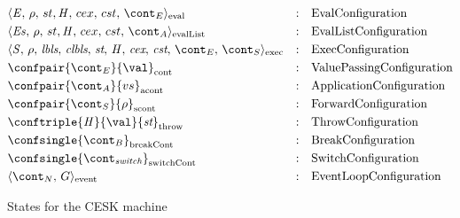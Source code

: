 \documentclass[a4paper,oneside,fleqn]{article}
\begin{document}
\newcommand{\breakconf}[1]{\confsingle{#1}_{\mathrm{breakCont}}}
\newcommand{\switchconf}[1]{\confsingle{#1}_{\mathrm{switchCont}}}
\newcommand{\contconf}[2]{\confpair{#1}{#2}_{\mathrm{cont}}}
\newcommand{\scontconf}[2]{\confpair{#1}{#2}_{\mathrm{scont}}}
\newcommand{\acontconf}[2]{\confpair{#1}{#2}_{\mathrm{acont}}}
\newcommand{\throwconf}[3]{\conftriple{#1}{#2}{#3}_{\mathrm{throw}}}
\newcommand{\evallistconf}[6]{\langle{#1},\,{#2},\,{#3},\handler,\,{#4},\,{#5},\,{#6}\rangle_{\mathrm{evalList}}}
\newcommand{\evalconf}[6]{\langle{#1},\,{#2},\,{#3},\handler,\,{#4},\,{#5},\,{#6}\rangle_{\mathrm{eval}}}
\newcommand{\execconf}[9]{\langle{#1},\,{#2},\,{#3},\,{#4},\,{#5},\,{#6},\,{#7},\,{#8},\,{#9}\rangle_{\mathrm{exec}}}
\newcommand{\eventconf}[2]{\langle{#1},\,{#2}\rangle_{\mathrm{event}}}

\begin{figure}[Htp]
  \begin{eqfigure}
  \begin{align}
    &\evalconf{\expr}{\env}{st}{cex}{cst}{\econt} & :\quad & \text{EvalConfiguration} \label{config:eval}\\
    &\evallistconf{\exprs}{\env}{st}{cex}{cst}{\acont} & :\quad & \text{EvalListConfiguration} \label{config:evallist}\\
    &\execconf{\stmt}{\env}{\lbls}{\clbls}{\strace}{\handler}{\cex,\,\cstrace}{\econt}{\scont}  & :\quad & \text{ExecConfiguration} \label{config:exec}\\
    &\contconf{\econt}{\val} & :\quad & \text{ValuePassingConfiguration} \label{config:econt}\\
    &\acontconf{\acont}{\vals} & :\quad & \text{ApplicationConfiguration} \label{config:acont}\\
    &\scontconf{\scont}{\env} & :\quad & \text{ForwardConfiguration} \label{config:scont}\\
    &\throwconf{\handler}{\val}{\strace} & :\quad & \text{ThrowConfiguration} \label{config:throw}\\
    &\breakconf{\bcont} & :\quad & \text{BreakConfiguration} \label{config:bcont}\\
    &\switchconf{\switchcont} & :\quad & \text{SwitchConfiguration} \\
    &\eventconf{\ncont}{\eventloop} & :\quad & \text{EventLoopConfiguration}
    \label{config:switchcont}
  \end{align}
  \caption{States for the CESK machine}
  \end{eqfigure}
\end{figure}
\end{document}
